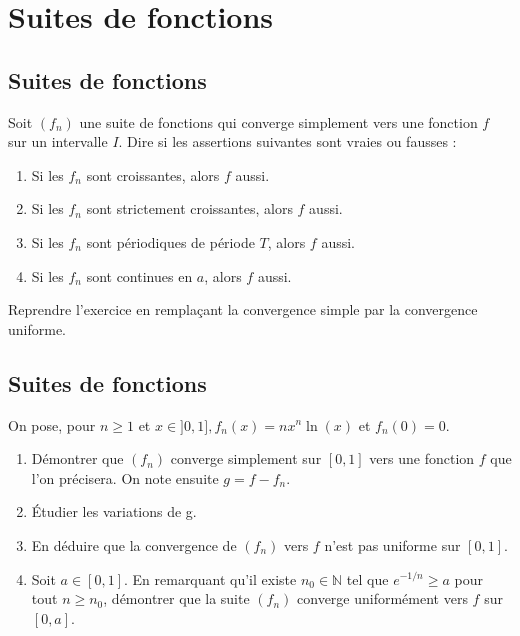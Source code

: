 \vspace{1em}
\section*{Suites de fonctions}

\subsection{Suites de fonctions}
Soit $\left(f_n\right)$ une suite de fonctions qui converge simplement vers une fonction $f$ sur un intervalle $I$. Dire si les assertions suivantes sont vraies ou fausses :
\begin{enumerate}[label = \alph*)]
  \item Si les $f_n$ sont croissantes, alors $f$ aussi.
  \item Si les $f_n$ sont strictement croissantes, alors $f$ aussi.
  \item Si les $f_n$ sont périodiques de période $T$, alors $f$ aussi.
  \item Si les $f_n$ sont continues en $a$, alors $f$ aussi.
\end{enumerate}

Reprendre l'exercice en remplaçant la convergence simple par la convergence uniforme.

\vspace{1em}

\subsection{Suites de fonctions}
On pose, pour $n \geq 1$ et $x \in] 0,1], f_n(x)=n x^n \ln (x)$ et $f_n(0)=0$.
\begin{enumerate}[label = \alph*)]
  \item Démontrer que $\left(f_n\right)$ converge simplement sur $[0,1]$ vers une fonction $f$ que l'on précisera. On note ensuite $g=f-f_n$.
  \item Étudier les variations de g.
  \item En déduire que la convergence de $\left(f_n\right)$ vers $f$ n'est pas uniforme sur $[0,1]$.
  \item Soit $a \in[0,1]$. En remarquant qu'il existe $n_0 \in \mathbb{N}$ tel que $e^{-1 / n} \geq a$ pour tout $n \geq n_0$, démontrer que la suite $\left(f_n\right)$ converge uniformément vers $f$ sur $[0, a]$.
\end{enumerate}